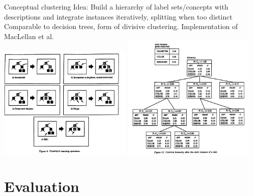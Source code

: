 \documentclass[rgb]{beamer}
\begin{document}
        \begin{frame}{Conceptual clustering}
        Idea: Build a hierarchy of label sets/concepts with descriptions and integrate instances iteratively, splitting when too distinct \\
        Comparable to decision trees, form of divisive clustering. 
        Implementation of MacLellan et al. \cite{trestle:2016a} \\
        \centering\includegraphics[keepaspectratio,width=0.48\textwidth,height=0.6\textheight]{graphics/aproaches/cobweb_ops.png} \hspace{2cm}
        \includegraphics[keepaspectratio,width=0.48\textwidth,height=0.6\textheight]{graphics/aproaches/cobweb_ex.png}
    \end{frame}

\section{Evaluation}
\end{document}
